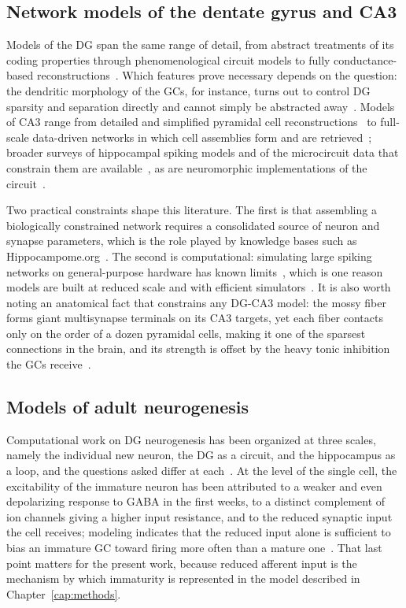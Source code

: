\subsection{Network models of the dentate gyrus and CA3}

Models of the DG span the same range of detail, from abstract treatments of its coding properties through phenomenological circuit
models to fully conductance-based reconstructions~\parencite{aimoneComputational2016}. Which features prove necessary depends on
the question: the dendritic morphology of the GCs, for instance, turns out to control DG sparsity and separation directly and
cannot simply be abstracted away~\parencite{chavlisDendrites2017}. Models of CA3 range from detailed and simplified pyramidal cell
reconstructions~\parencite{miglioreCA32019} to full-scale data-driven networks in which cell assemblies form and are
retrieved~\parencite{kopsickFormation2024}; broader surveys of hippocampal spiking models and of the microcircuit data that
constrain them are available~\parencite{cutsuridisHippocampal2019, suttonSpiking2021}, as are neuromorphic implementations of the
circuit~\parencite{casanueva-moratoBioinspired2023}.

Two practical constraints shape this literature. The first is that assembling a biologically constrained network requires a
consolidated source of neuron and synapse parameters, which is the role played by knowledge bases such as
Hippocampome.org~\parencite{wheelerHippocampomeorg2023}. The second is computational: simulating large spiking networks on
general-purpose hardware has known limits~\parencite{zenkeLimits2014}, which is one reason models are built at reduced scale and
with efficient simulators~\parencite{stimbergBrian2019a}. It is also worth noting an anatomical fact that constrains any DG-CA3
model: the mossy fiber forms giant multisynapse terminals on its CA3 targets, yet each fiber contacts only on the order of a dozen
pyramidal cells, making it one of the sparsest connections in the brain, and its strength is offset by the heavy tonic inhibition
the GCs receive~\parencite{aimoneComputational2016}.

\subsection{Models of adult neurogenesis}

Computational work on DG neurogenesis has been organized at three scales, namely the individual new neuron, the DG as a circuit,
and the hippocampus as a loop, and the questions asked differ at each~\parencite{aimoneComputational2016, aimoneModeling2011}. At
the level of the single cell, the excitability of the immature neuron has been attributed to a weaker and even depolarizing
response to GABA in the first weeks, to a distinct complement of ion channels giving a higher input resistance, and to the reduced
synaptic input the cell receives; modeling indicates that the reduced input alone is sufficient to bias an immature GC toward
firing more often than a mature one~\parencite{aimoneComputational2016}. That last point matters for the present work, because
reduced afferent input is the mechanism by which immaturity is represented in the model described in Chapter~\ref{cap:methods}.

